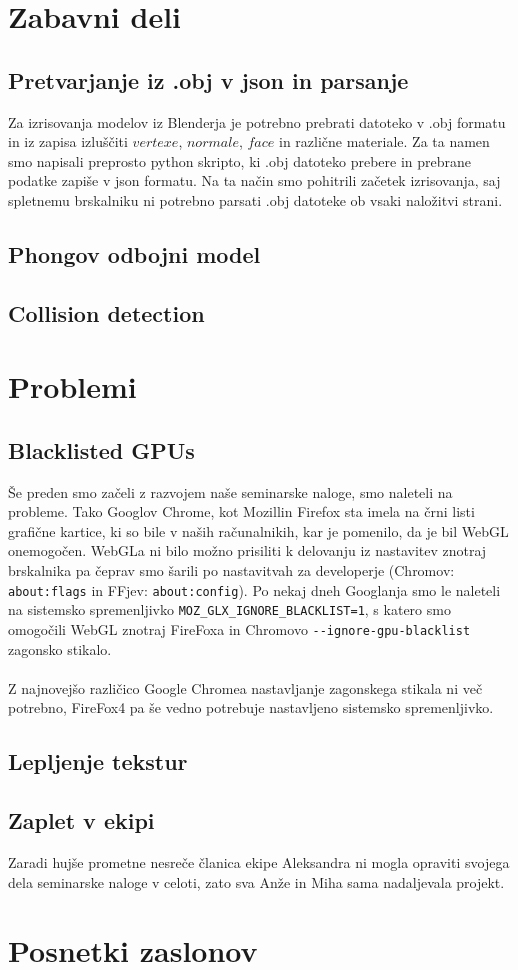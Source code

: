 \documentclass[10pt,a4paper]{article}
\begin{document}
\section{Zabavni deli}
\subsection{Pretvarjanje iz .obj v json in parsanje}
Za izrisovanja modelov iz Blenderja je potrebno prebrati datoteko v .obj formatu in iz zapisa
izluščiti $vertexe$, $normale$, $face$ in različne materiale. Za ta namen smo 
napisali preprosto python skripto, ki .obj datoteko prebere in prebrane podatke 
zapiše v json formatu. Na ta način smo pohitrili začetek izrisovanja, saj spletnemu
brskalniku ni potrebno parsati .obj datoteke ob vsaki naložitvi strani.
\subsection{Phongov odbojni model}
\subsection{Collision detection}
\pagebreak
\section{Problemi}
\subsection{Blacklisted GPUs}
Še preden smo začeli z razvojem naše seminarske naloge, smo naleteli na probleme.
Tako Googlov Chrome, kot Mozillin Firefox sta imela na črni listi grafične kartice,
ki so bile v naših računalnikih, kar je pomenilo, da je bil WebGL onemogočen. 
WebGLa ni bilo možno prisiliti k delovanju iz nastavitev znotraj brskalnika pa 
čeprav smo šarili po nastavitvah za developerje (Chromov: \verb|about:flags| in FFjev: \verb|about:config|).
Po nekaj dneh Googlanja smo le naleteli na sistemsko spremenljivko \verb|MOZ_GLX_IGNORE_BLACKLIST=1|,
s katero smo omogočili WebGL znotraj FireFoxa in Chromovo \verb|--ignore-gpu-blacklist| zagonsko stikalo.\\\\
Z najnovejšo različico Google Chromea nastavljanje zagonskega stikala ni več potrebno, 
FireFox4 pa še vedno potrebuje nastavljeno sistemsko spremenljivko.
\subsection{Lepljenje tekstur}
\subsection{Zaplet v ekipi}
Zaradi hujše prometne nesreče članica ekipe Aleksandra ni mogla opraviti svojega dela 
seminarske naloge v celoti, zato sva Anže in Miha sama nadaljevala projekt. 
\pagebreak
\section{Posnetki zaslonov}
\end{document}
